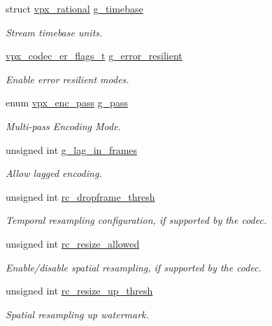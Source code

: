 \begin{DoxyCompactItemize}
struct \hyperlink{structvpx__rational}{vpx\+\_\+rational} \hyperlink{structvpx__codec__enc__cfg_a6498d378e4c29ef3e22258289e481087}{g\+\_\+timebase}
\begin{DoxyCompactList}\small\item\em Stream timebase units. \end{DoxyCompactList}\item 
\hyperlink{group__encoder_ga77e0e1fff62556a4f4d54c84467a41f3}{vpx\+\_\+codec\+\_\+er\+\_\+flags\+\_\+t} \hyperlink{structvpx__codec__enc__cfg_a4e17173b66ca0d7dfba9978625d7ba76}{g\+\_\+error\+\_\+resilient}
\begin{DoxyCompactList}\small\item\em Enable error resilient modes. \end{DoxyCompactList}\item 
enum \hyperlink{group__encoder_ga476c5417f9c15a1dc5d3f68fa44c493f}{vpx\+\_\+enc\+\_\+pass} \hyperlink{structvpx__codec__enc__cfg_a70d62d87aae7d1168746577f14a6dccf}{g\+\_\+pass}
\begin{DoxyCompactList}\small\item\em Multi-\/pass Encoding Mode. \end{DoxyCompactList}\item 
unsigned int \hyperlink{structvpx__codec__enc__cfg_a992668d9e30305f3f7ab2672ea31a890}{g\+\_\+lag\+\_\+in\+\_\+frames}
\begin{DoxyCompactList}\small\item\em Allow lagged encoding. \end{DoxyCompactList}\item 
unsigned int \hyperlink{structvpx__codec__enc__cfg_a619269f9a6904de58c4790e6806a3905}{rc\+\_\+dropframe\+\_\+thresh}
\begin{DoxyCompactList}\small\item\em Temporal resampling configuration, if supported by the codec. \end{DoxyCompactList}\item 
unsigned int \hyperlink{structvpx__codec__enc__cfg_a02a4e2f18fb0fdfff44df8b0d9a99d6c}{rc\+\_\+resize\+\_\+allowed}
\begin{DoxyCompactList}\small\item\em Enable/disable spatial resampling, if supported by the codec. \end{DoxyCompactList}\item 
unsigned int \hyperlink{structvpx__codec__enc__cfg_a855599c0660f31dfcab4a64996b4f6ad}{rc\+\_\+resize\+\_\+up\+\_\+thresh}
\begin{DoxyCompactList}\small\item\em Spatial resampling up watermark. \end{DoxyCompactList}\item 

\end{DoxyCompactItemize}
